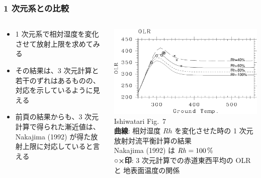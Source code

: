 \documentclass[aspectratio=149,9pt,fleqn]{beamer}
\newcommand{\hmemph}[1]{\textbf{#1}}
\begin{document}
\begin{frame}
	\frametitle{1 次元系との比較}
	\begin{columns}[T,onlytextwidth]
		\begin{column}{.4\textwidth}
			\begin{itemize}
				\item 1 次元系で相対湿度を変化させて放射上限を求めてみる
				\item その結果は、3 次元計算と若干のずれはあるものの、対応を示しているように見える
				\item 前頁の結果からも、3 次元計算で得られた漸近値は、Nakajima \etal (1992)
					が得た放射上限に対応していると言える
			\end{itemize}
		\end{column}
		\begin{column}{.6\textwidth}
			\centering\scriptsize
			\includegraphics[width=.8\textwidth]{./fig/Tg-OLR-1dimL99-3dEq-crop.pdf}\\
			Ishiwatari \etal Fig.~7\\
			\hmemph{曲線}: 相対湿度 \(\mathit{Rh}\) を変化させた時の 1 次元放射対流平衡計算の結果\\
			Nakajima \etal (1992) は \(\mathit{Rh}=100\hmu{\%}\)\\
			\hmemph{○×印}: 3 次元計算での赤道東西平均の OLR と 地表面温度の関係
		\end{column}
	\end{columns}
\end{frame}

\end{document}
